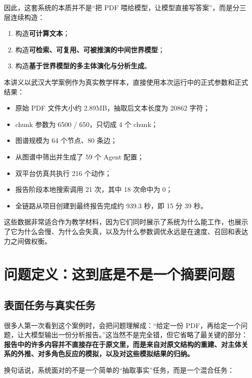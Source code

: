 \documentclass[UTF8,10pt,oneside]{ctexbook}
\begin{document}
因此，这套系统的本质并不是“把 PDF 喂给模型，让模型直接写答案”，而是分三层连续构造：

\begin{enumerate}
  \item 构造\textbf{可计算文本}；
  \item 构造\textbf{可检索、可复用、可被推演的中间世界模型}；
  \item 构造\textbf{基于世界模型的多主体演化与分析生成}。
\end{enumerate}

本讲义以武汉大学案例作为真实教学样本，直接使用本次运行中的正式参数和正式结果：

\begin{itemize}
  \item 原始 PDF 文件大小约 2.89MB，抽取后文本长度为 20862 字符；
  \item chunk 参数为 6500 / 650，只切成 4 个 chunk；
  \item 图谱规模为 64 个节点、80 条边；
  \item 从图谱中筛出并生成了 59 个 Agent 配置；
  \item 双平台仿真共执行 216 个动作；
  \item 报告阶段本地搜索调用 21 次，其中 18 次命中为 0；
  \item 全链路从项目创建到最终报告完成约 939.3 秒，即 15 分 39 秒。
\end{itemize}

这些数据非常适合作为教学材料，因为它们同时展示了系统为什么能工作，也展示了它为什么会慢、为什么会失真，以及为什么参数调优永远是在速度、召回和表达力之间做权衡。

\tableofcontents

\mainmatter

\chapter{问题定义：这到底是不是一个摘要问题}

\section{表面任务与真实任务}

很多人第一次看到这个案例时，会把问题理解成：“给定一份 PDF，再给定一个问题，让大模型输出一份分析报告。”这当然不是完全错，但它省略了最关键的部分：\textbf{报告中的许多内容并不直接存在于原文里，而是来自对原文结构的重建、对主体关系的外推、对多角色反应的模拟，以及对这些模拟结果的归纳。}

换句话说，系统面对的不是一个简单的“抽取事实”任务，而是一个混合任务：
\end{document}
